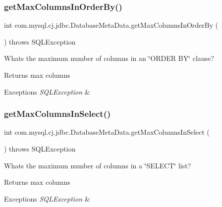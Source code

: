 \subsubsection{\texorpdfstring{get\+Max\+Columns\+In\+Order\+By()}{getMaxColumnsInOrderBy()}}
{\footnotesize\ttfamily int com.\+mysql.\+cj.\+jdbc.\+Database\+Meta\+Data.\+get\+Max\+Columns\+In\+Order\+By (\begin{DoxyParamCaption}{ }\end{DoxyParamCaption}) throws S\+Q\+L\+Exception}

What\textquotesingle{}s the maximum number of columns in an \char`\"{}\+O\+R\+D\+E\+R B\+Y\char`\"{} clause?

\begin{DoxyReturn}{Returns}
max columns 
\end{DoxyReturn}

\begin{DoxyExceptions}{Exceptions}
{\em S\+Q\+L\+Exception} & \\
\hline
\end{DoxyExceptions}
\mbox{\label{classcom_1_1mysql_1_1cj_1_1jdbc_1_1_database_meta_data_ab59408daad0419ca46b30d530d1698f1}} 
\subsubsection{\texorpdfstring{get\+Max\+Columns\+In\+Select()}{getMaxColumnsInSelect()}}
{\footnotesize\ttfamily int com.\+mysql.\+cj.\+jdbc.\+Database\+Meta\+Data.\+get\+Max\+Columns\+In\+Select (\begin{DoxyParamCaption}{ }\end{DoxyParamCaption}) throws S\+Q\+L\+Exception}

What\textquotesingle{}s the maximum number of columns in a \char`\"{}\+S\+E\+L\+E\+C\+T\char`\"{} list?

\begin{DoxyReturn}{Returns}
max columns 
\end{DoxyReturn}

\begin{DoxyExceptions}{Exceptions}
{\em S\+Q\+L\+Exception} & \\
\hline
\end{DoxyExceptions}
\mbox{\label{classcom_1_1mysql_1_1cj_1_1jdbc_1_1_database_meta_data_ac8a4df2879a73abc6b4f67597e4e1889}} 
